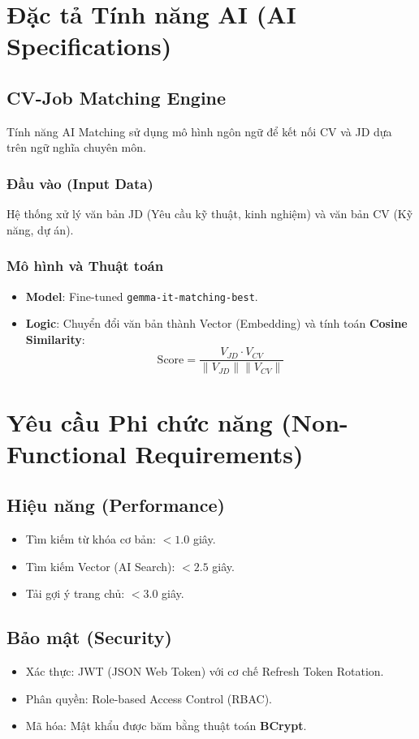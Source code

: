 \documentclass[12pt, a4paper]{report}
\begin{document}
\chapter{Đặc tả Tính năng AI (AI Specifications)}
\section{CV-Job Matching Engine}
Tính năng AI Matching sử dụng mô hình ngôn ngữ để kết nối CV và JD dựa trên ngữ nghĩa chuyên môn.

\subsection{Đầu vào (Input Data)}
Hệ thống xử lý văn bản JD (Yêu cầu kỹ thuật, kinh nghiệm) và văn bản CV (Kỹ năng, dự án).

\subsection{Mô hình và Thuật toán}
\begin{itemize}
    \item \textbf{Model}: Fine-tuned \texttt{gemma-it-matching-best}.
    \item \textbf{Logic}: Chuyển đổi văn bản thành Vector (Embedding) và tính toán \textbf{Cosine Similarity}:
    \begin{equation}
        \text{Score} = \frac{V_{JD} \cdot V_{CV}}{\|V_{JD}\| \|V_{CV}\|}
    \end{equation}
\end{itemize}

\chapter{Yêu cầu Phi chức năng (Non-Functional Requirements)}
\section{Hiệu năng (Performance)}
\begin{itemize}
    \item Tìm kiếm từ khóa cơ bản: $< 1.0$ giây.
    \item Tìm kiếm Vector (AI Search): $< 2.5$ giây.
    \item Tải gợi ý trang chủ: $< 3.0$ giây.
\end{itemize}

\section{Bảo mật (Security)}
\begin{itemize}
    \item Xác thực: JWT (JSON Web Token) với cơ chế Refresh Token Rotation.
    \item Phân quyền: Role-based Access Control (RBAC).
    \item Mã hóa: Mật khẩu được băm bằng thuật toán \textbf{BCrypt}.
\end{itemize}
\end{document}
